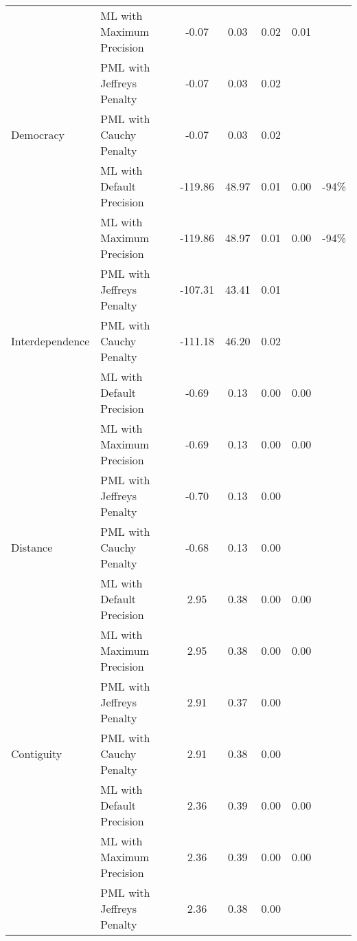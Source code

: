\begin{tabular}{llccccc}
 & ML with Maximum Precision & -0.07 & 0.03 & 0.02 & 0.01 & \\

 & PML with Jeffreys Penalty & -0.07 & 0.03 & 0.02 &  & \\

\multirow{-4}{*}{\raggedright\arraybackslash Democracy} & PML with Cauchy Penalty & -0.07 & 0.03 & 0.02 &  & \\
\cmidrule{1-7}
 & ML with Default Precision & -119.86 & 48.97 & 0.01 & 0.00 & -94\%\\

 & ML with Maximum Precision & -119.86 & 48.97 & 0.01 & 0.00 & -94\%\\

 & PML with Jeffreys Penalty & -107.31 & 43.41 & 0.01 &  & \\

\multirow{-4}{*}{\raggedright\arraybackslash Interdependence} & PML with Cauchy Penalty & -111.18 & 46.20 & 0.02 &  & \\
\cmidrule{1-7}
 & ML with Default Precision & -0.69 & 0.13 & 0.00 & 0.00 & \\

 & ML with Maximum Precision & -0.69 & 0.13 & 0.00 & 0.00 & \\

 & PML with Jeffreys Penalty & -0.70 & 0.13 & 0.00 &  & \\

\multirow{-4}{*}{\raggedright\arraybackslash Distance} & PML with Cauchy Penalty & -0.68 & 0.13 & 0.00 &  & \\
\cmidrule{1-7}
 & ML with Default Precision & 2.95 & 0.38 & 0.00 & 0.00 & \\

 & ML with Maximum Precision & 2.95 & 0.38 & 0.00 & 0.00 & \\

 & PML with Jeffreys Penalty & 2.91 & 0.37 & 0.00 &  & \\

\multirow{-4}{*}{\raggedright\arraybackslash Contiguity} & PML with Cauchy Penalty & 2.91 & 0.38 & 0.00 &  & \\
\cmidrule{1-7}
 & ML with Default Precision & 2.36 & 0.39 & 0.00 & 0.00 & \\

 & ML with Maximum Precision & 2.36 & 0.39 & 0.00 & 0.00 & \\

 & PML with Jeffreys Penalty & 2.36 & 0.38 & 0.00 &  & \\


\end{tabular}
